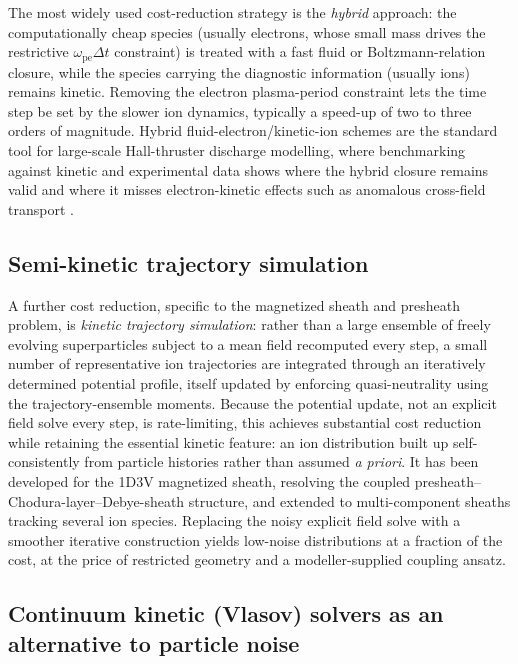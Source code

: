 The most widely used cost-reduction strategy is the \emph{hybrid} approach: the computationally cheap species (usually electrons, whose small mass drives the restrictive $\omega_{\mathrm{pe}}\Delta t$ constraint) is treated with a fast fluid or Boltzmann-relation closure, while the species carrying the diagnostic information (usually ions) remains kinetic. Removing the electron plasma-period constraint lets the time step be set by the slower ion dynamics, typically a speed-up of two to three orders of magnitude. Hybrid fluid-electron/kinetic-ion schemes are the standard tool for large-scale Hall-thruster discharge modelling, where benchmarking against kinetic and experimental data shows where the hybrid closure remains valid and where it misses electron-kinetic effects such as anomalous cross-field transport \cite{ref0433}.

\subsection{Semi-kinetic trajectory simulation}

A further cost reduction, specific to the magnetized sheath and presheath problem, is \emph{kinetic trajectory simulation}: rather than a large ensemble of freely evolving superparticles subject to a mean field recomputed every step, a small number of representative ion trajectories are integrated through an iteratively determined potential profile, itself updated by enforcing quasi-neutrality using the trajectory-ensemble moments. Because the potential update, not an explicit field solve every step, is rate-limiting, this achieves substantial cost reduction while retaining the essential kinetic feature: an ion distribution built up self-consistently from particle histories rather than assumed \emph{a priori}. It has been developed for the 1D3V magnetized sheath, resolving the coupled presheath--Chodura-layer--Debye-sheath structure, and extended to multi-component sheaths tracking several ion species. Replacing the noisy explicit field solve with a smoother iterative construction yields low-noise distributions at a fraction of the cost, at the price of restricted geometry and a modeller-supplied coupling ansatz.

\subsection{Continuum kinetic (Vlasov) solvers as an alternative to particle noise}

